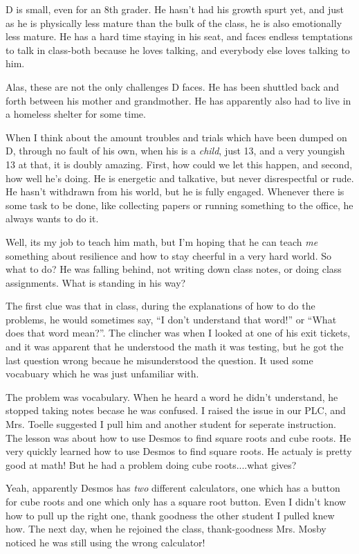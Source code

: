 \documentclass[11pt]{elegantbook}
\begin{document}
D is small, even for an 8th grader.  He hasn't had his growth spurt
yet, and just as he is physically less mature than the bulk of the
class, he is also emotionally less mature.  He has a hard time staying
in his seat, and faces endless temptations to talk in class-both
because he loves talking, and everybody else loves talking to him.

Alas, these are not the only challenges D faces.  He has been shuttled
back and forth between his mother and grandmother.  He has apparently
also had to live in a homeless shelter for some time. 

When I think about the amount troubles and trials which have been
dumped on D, through no fault of his own, when his is a {\em child},
just 13, and a very youngish 13 at that, it is doubly amazing.  First,
how could we let this happen, and second, how well he's doing.  He is
energetic and talkative, but never disrespectful or rude.  He hasn't
withdrawn from his world, but he is fully engaged.  Whenever there is
some task to be done, like collecting papers or running something to
the office, he always wants to do it.

Well, its my job to teach him math, but I'm hoping that he can teach
{\em me} something about resilience and how to stay cheerful in a very
hard world.  So what to do?  He was falling behind, not writing down
class notes, or doing class assignments.  What is standing in his way?

The first clue was that in class, during the explanations of how to do
the problems, he would sometimes say, ``I don't understand that
word!'' or ``What does that word mean?''.  The clincher was when I
looked at one of his exit tickets, and it was apparent that he
understood the math it was testing, but he got the last question wrong
becaue he misunderstood the question.  It used some vocabuary which he
was just unfamiliar with.

The problem was vocabulary.  When he heard a word he didn't
understand, he stopped taking notes becase he was confused. I raised
the issue in our PLC, and Mrs. Toelle suggested I pull him and another
student for seperate instruction.  The lesson was about how to use
Desmos to find square roots and cube roots.  He very quickly learned
how to use Desmos to find square roots.  He actualy is pretty good at
math!  But he had a problem doing cube roots....what gives?

Yeah, apparently Desmos has {\em two} different calculators, one which
has a button for cube roots and one which only has a square root
button.  Even I didn't know how to pull up the right one, thank
goodness the other student I pulled knew how.  The next day, when he
rejoined the class, thank-goodness Mrs. Mosby noticed he was still
using the wrong calculator!
\end{document}
